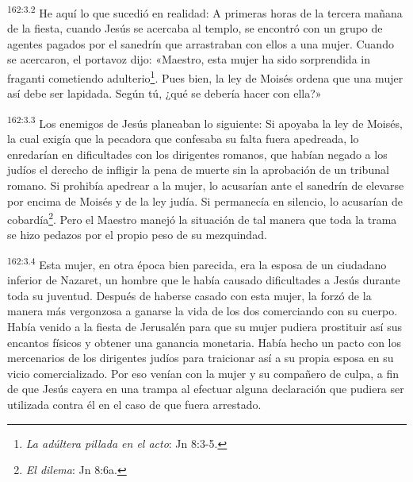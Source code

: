 \par
\textsuperscript{162:3.2} He aquí lo que sucedió en realidad: A primeras horas de la tercera mañana de la fiesta, cuando Jesús se acercaba al templo, se encontró con un grupo de agentes pagados por el sanedrín que arrastraban con ellos a una mujer. Cuando se acercaron, el portavoz dijo: «Maestro, esta mujer ha sido sorprendida in fraganti cometiendo adulterio\footnote{\textit{La adúltera pillada en el acto}: Jn 8:3-5.}. Pues bien, la ley de Moisés ordena que una mujer así debe ser lapidada. Según tú, ¿qué se debería hacer con ella?»

\par
\textsuperscript{162:3.3} Los enemigos de Jesús planeaban lo siguiente: Si apoyaba la ley de Moisés, la cual exigía que la pecadora que confesaba su falta fuera apedreada, lo enredarían en dificultades con los dirigentes romanos, que habían negado a los judíos el derecho de infligir la pena de muerte sin la aprobación de un tribunal romano. Si prohibía apedrear a la mujer, lo acusarían ante el sanedrín de elevarse por encima de Moisés y de la ley judía. Si permanecía en silencio, lo acusarían de cobardía\footnote{\textit{El dilema}: Jn 8:6a.}. Pero el Maestro manejó la situación de tal manera que toda la trama se hizo pedazos por el propio peso de su mezquindad.

\par
\textsuperscript{162:3.4} Esta mujer, en otra época bien parecida, era la esposa de un ciudadano inferior de Nazaret, un hombre que le había causado dificultades a Jesús durante toda su juventud. Después de haberse casado con esta mujer, la forzó de la manera más vergonzosa a ganarse la vida de los dos comerciando con su cuerpo. Había venido a la fiesta de Jerusalén para que su mujer pudiera prostituir así sus encantos físicos y obtener una ganancia monetaria. Había hecho un pacto con los mercenarios de los dirigentes judíos para traicionar así a su propia esposa en su vicio comercializado. Por eso venían con la mujer y su compañero de culpa, a fin de que Jesús cayera en una trampa al efectuar alguna declaración que pudiera ser utilizada contra él en el caso de que fuera arrestado.

